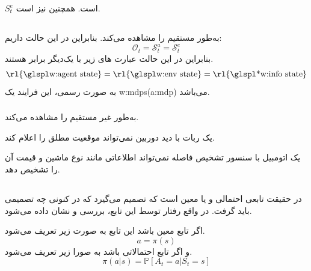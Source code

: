 \begin{remark}
	 $S_t^e$   است.
	همچنین 
	 نیز  است.
\end{remark}


\subsection{}

\subsubsection{}

به‌طور مستقیم  را مشاهده می‌کند. بنابراین در این حالت داریم:
	\[
		\mathcal{O}_t = \mathcal{S}_t^a = \mathcal{S}_t^e
	\]
بنابراین در این حالت عبارت های زیر با یک‌دیگر برابر هستند.
	\[
	\text{\rl{\w{agent state}}} = \text{\rl{\w{env state}}} = \text{\rl{\ws{info state}}}
	\]
به صورت رسمی، این فرایند یک \Glspl{w:mdp}(\gls*{a:mdp}) می‌باشد.
\cite{Sutton1998}
	

\subsubsection{}
 به‌طور غیر مستقیم  را مشاهده می‌کند.
\begin{example}
			یک ربات با دید دوربین نمی‌تواند موقعیت مطلق را اعلام کند.		
\end{example}
\begin{example}
	یک اتومبیل با سنسور تشخیص فاصله نمی‌تواند اطلاعاتی مانند نوع ماشین و قیمت آن را تشخیص دهد.
\end{example}

\subsection{}
در حقیقت تابعی احتمالی و یا معین است که تصمیم می‌گیرد که در  کنونی چه تصمیمی باید گرفت. در واقع رفتار  توسط این تابع، بررسی و نشان داده می‌شود.

\begin{definition}
	اگر تابع معین باشد این تابع به صورت زیر تعریف می‌شود.
$$
a = \pi(s)
$$
و اگر تابع احتمالاتی باشد به صورا زیر تعریف می‌شود.
$$
\pi(a | s)=\mathbb{P}\left[A_{t}=a | S_{t}=s\right]
$$
\end{definition}











